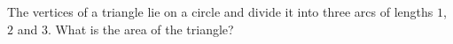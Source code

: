 The vertices of a triangle lie on a circle and divide it into three arcs of lengths $1$, $2$ and $3$. What is the area of the triangle?
